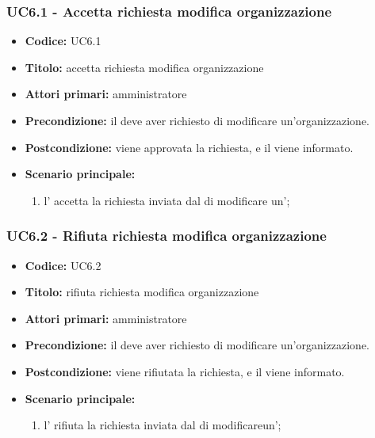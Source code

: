 \documentclass[casi-duso]{subfiles}
\begin{document}
\subsubsection{UC6.1 - Accetta richiesta modifica organizzazione}
\label{subsub:UC6.1}
\begin{itemize}
  \item \textbf{Codice:} UC6.1
  \item \textbf{Titolo:} accetta richiesta modifica organizzazione
  \item \textbf{Attori primari:} amministratore
  \item \textbf{Precondizione:} il  deve aver richiesto di modificare un'organizzazione.
  \item \textbf{Postcondizione:} viene approvata la richiesta, e il  viene informato.
  \item \textbf{Scenario principale:} 
  \begin{enumerate}
    \item  l' accetta la richiesta inviata dal  di modificare un';
  \end{enumerate}
\end{itemize}

\subsubsection{UC6.2 - Rifiuta richiesta modifica organizzazione}
\label{subsub:UC6.2}
\begin{itemize}
  \item \textbf{Codice:} UC6.2
  \item \textbf{Titolo:} rifiuta richiesta modifica organizzazione
  \item \textbf{Attori primari:} amministratore
  \item \textbf{Precondizione:} il  deve aver richiesto di modificare un'organizzazione.
  \item \textbf{Postcondizione:} viene rifiutata la richiesta, e il  viene informato.
  \item \textbf{Scenario principale:} 
  \begin{enumerate}
    \item l' rifiuta la richiesta inviata dal  di modificareun';
  \end{enumerate}
\end{itemize}
\end{document}
